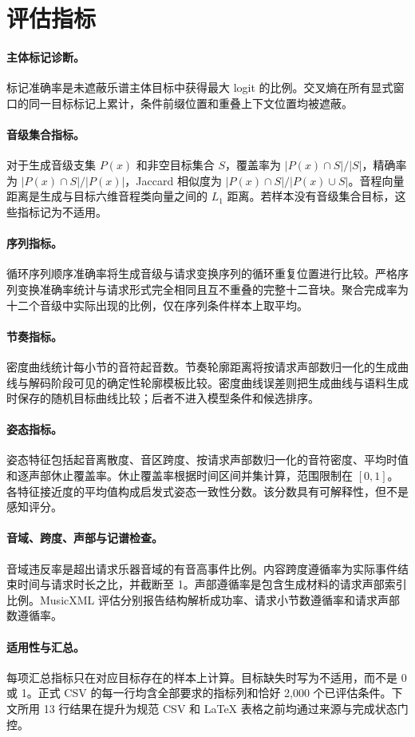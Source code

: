 \section{评估指标}
\label{sec:metrics-zh}

\paragraph{主体标记诊断。}
标记准确率是未遮蔽乐谱主体目标中获得最大 logit 的比例。交叉熵在所有显式窗口的同一目标标记上累计，条件前缀位置和重叠上下文位置均被遮蔽。

\paragraph{音级集合指标。}
对于生成音级支集 $P(x)$ 和非空目标集合 $S$，覆盖率为 $|P(x)\cap S|/|S|$，精确率为 $|P(x)\cap S|/|P(x)|$，Jaccard 相似度为 $|P(x)\cap S|/|P(x)\cup S|$。音程向量距离是生成与目标六维音程类向量之间的 $L_1$ 距离。若样本没有音级集合目标，这些指标记为不适用。

\paragraph{序列指标。}
循环序列顺序准确率将生成音级与请求变换序列的循环重复位置进行比较。严格序列变换准确率统计与请求形式完全相同且互不重叠的完整十二音块。聚合完成率为十二个音级中实际出现的比例，仅在序列条件样本上取平均。

\paragraph{节奏指标。}
密度曲线统计每小节的音符起音数。节奏轮廓距离将按请求声部数归一化的生成曲线与解码阶段可见的确定性轮廓模板比较。密度曲线误差则把生成曲线与语料生成时保存的随机目标曲线比较；后者不进入模型条件和候选排序。

\paragraph{姿态指标。}
姿态特征包括起音离散度、音区跨度、按请求声部数归一化的音符密度、平均时值和逐声部休止覆盖率。休止覆盖率根据时间区间并集计算，范围限制在 $[0,1]$。各特征接近度的平均值构成启发式姿态一致性分数。该分数具有可解释性，但不是感知评分。

\paragraph{音域、跨度、声部与记谱检查。}
音域违反率是超出请求乐器音域的有音高事件比例。内容跨度遵循率为实际事件结束时间与请求时长之比，并截断至 1。声部遵循率是包含生成材料的请求声部索引比例。MusicXML 评估分别报告结构解析成功率、请求小节数遵循率和请求声部数遵循率。

\paragraph{适用性与汇总。}
每项汇总指标只在对应目标存在的样本上计算。目标缺失时写为不适用，而不是 0 或 1。正式 CSV 的每一行均含全部要求的指标列和恰好 2,000 个已评估条件。下文所用 13 行结果在提升为规范 CSV 和 LaTeX 表格之前均通过来源与完成状态门控。
